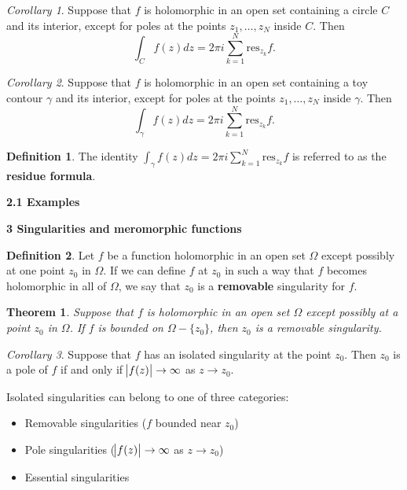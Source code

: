\documentclass{article}
\newtheorem{theorem}{Theorem}
\theoremstyle{definition}
\newtheorem{definition}{Definition}[section]
\theoremstyle{remark}
\newtheorem{corollary}{Corollary}[theorem]
\begin{document}
    \begin{corollary}
        Suppose that $f$ is holomorphic in an open set containing a circle $C$ and its interior, except for poles at the points
        $z_1,\hdots,z_N$ inside $C$. Then
        \[ \int_C f(z)dz = 2\pi i\sum_{k=1}^{N} \text{res}_{z_k}f. \]
    \end{corollary}

    \begin{corollary}
        Suppose that $f$ is holomorphic in an open set containing a toy contour $\gamma$ and its interior, except for poles at the
        points $z_1,\hdots,z_N$ inside $\gamma$. Then
        \[ \int_{\gamma} f(z)dz = 2\pi i\sum_{k=1}^{N} \text{res}_{z_k}f. \]
    \end{corollary}

    \begin{definition}
        The identity $\int_{\gamma} f(z)dz = 2\pi i\sum_{k=1}^N \text{res}_{z_k}f$ is referred to as the \textbf{residue formula}.
    \end{definition}

    \textbf{2.1 Examples}

    \newpage

    \textbf{3 Singularities and meromorphic functions}

    \begin{definition}
        Let $f$ be a function holomorphic in an open set $\Omega$ except possibly at one point $z_0$ in $\Omega$. If we can define
        $f$ at $z_0$ in such a way that $f$ becomes holomorphic in all of $\Omega$, we say that $z_0$ is a \textbf{removable}
        singularity for $f$.
    \end{definition}

    \begin{theorem}
        Suppose that $f$ is holomorphic in an open set $\Omega$ except possibly at a point $z_0$ in $\Omega$. If $f$ is bounded on
        $\Omega-\{z_0\}$, then $z_0$ is a removable singularity.
    \end{theorem}

    \begin{corollary}
        Suppose that $f$ has an isolated singularity at the point $z_0$. Then $z_0$ is a pole of $f$ if and only if 
        $\abs{f(z)}\to\infty$ as $z\to z_0$.
    \end{corollary}

    Isolated singularities can belong to one of three categories:
    \begin{itemize}
        \item Removable singularities ($f$ bounded near $z_0$)
        \item Pole singularities ($\abs{f(z)}\to\infty$ as $z\to z_0$)
        \item Essential singularities
    \end{itemize}
\end{document}
